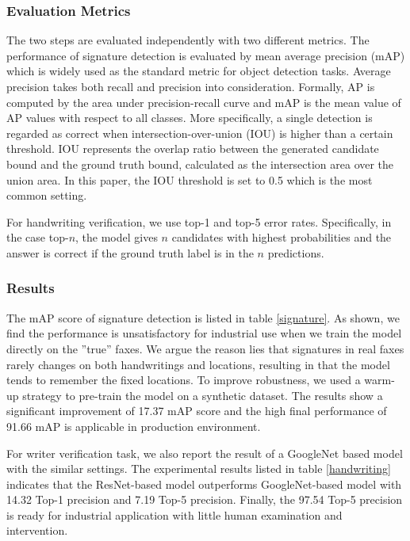 \documentclass[sigconf]{acmart}
\begin{document}
\subsubsection*{\rm \textbf{Evaluation Metrics}}
The two steps are evaluated independently with two different metrics. The performance of signature detection is evaluated by mean average precision (mAP) which is widely used as the standard metric for object detection tasks. Average precision takes both recall and precision into consideration. Formally, AP is computed by the area under precision-recall curve and mAP is the mean value of AP values with respect to all classes. More specifically, a single detection is regarded as correct when intersection-over-union (IOU) is higher than a certain threshold. IOU represents the overlap ratio between the generated candidate bound and the ground truth bound, calculated as the intersection area over the union area. In this paper, the IOU threshold is set to 0.5 which is the most common setting. 

For handwriting verification, we use top-1 and top-5 error rates. Specifically, in the case top-$n$, the model gives $n$ candidates with highest probabilities and the answer is correct if the ground truth label is in the $n$ predictions. 
\subsubsection*{\rm \textbf{Results}}
The mAP score of signature detection is listed in table \ref{signature}. As shown, we find the performance is unsatisfactory for industrial use when we train the model directly on the ''true'' faxes. We argue the reason lies that signatures in real faxes rarely changes on both handwritings and locations, resulting in that the model tends to remember the fixed locations. To improve robustness, we used a warm-up strategy to pre-train the model on a synthetic dataset. The results show a significant improvement of 17.37 mAP score and the high final performance of 91.66 mAP is applicable in production environment.

For writer verification task, we also report the result of a GoogleNet based model \cite{szegedy2015going} with the similar settings. The experimental results listed in table \ref{handwriting} indicates that the ResNet-based model outperforms GoogleNet-based model with 14.32 Top-1 precision and 7.19 Top-5 precision. Finally, the 97.54 Top-5 precision is ready for industrial application with little human examination and intervention.
\end{document}
